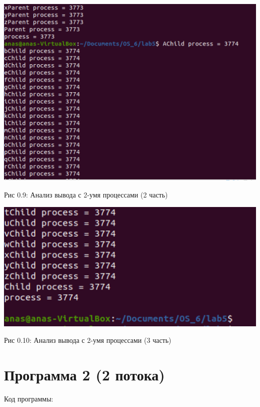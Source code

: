 \documentclass[12pt]{report}
\begin{document}
\begin{center}
		\includegraphics[scale=0.47]{pics/Res2_2.png}
		
			Рис 0.9: Анализ вывода с 2-умя процессами (2 часть)
\end{center}

\begin{center}
		\includegraphics[scale=0.6]{pics/Res2_3.png}
		
			Рис 0.10: Анализ вывода с 2-умя процессами (3 часть)
\end{center}

\section{Программа 2 (2 потока)}

Код программы:
\end{document}
